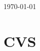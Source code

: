 \documentclass[11pt]{article}
\begin{document}
\begin{titlepage}

	\vfill\vfill\vfill %

	{\large\today} %




	\vfill %

\end{titlepage}


\section{CVS}
\end{document}

